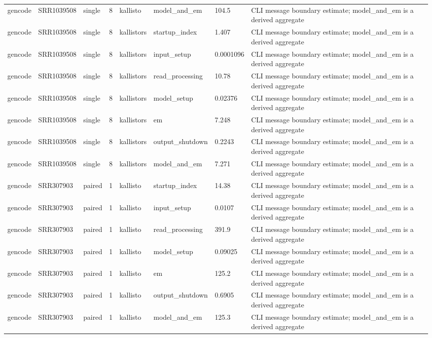 \begin{tabular}{llllllll}
gencode & SRR1039508 & single & 8 & kallisto & model\_and\_em & 104.5 & CLI message boundary estimate; model\_and\_em is a derived aggregate \\
gencode & SRR1039508 & single & 8 & kallistors & startup\_index & 1.407 & CLI message boundary estimate; model\_and\_em is a derived aggregate \\
gencode & SRR1039508 & single & 8 & kallistors & input\_setup & 0.0001096 & CLI message boundary estimate; model\_and\_em is a derived aggregate \\
gencode & SRR1039508 & single & 8 & kallistors & read\_processing & 10.78 & CLI message boundary estimate; model\_and\_em is a derived aggregate \\
gencode & SRR1039508 & single & 8 & kallistors & model\_setup & 0.02376 & CLI message boundary estimate; model\_and\_em is a derived aggregate \\
gencode & SRR1039508 & single & 8 & kallistors & em & 7.248 & CLI message boundary estimate; model\_and\_em is a derived aggregate \\
gencode & SRR1039508 & single & 8 & kallistors & output\_shutdown & 0.2243 & CLI message boundary estimate; model\_and\_em is a derived aggregate \\
gencode & SRR1039508 & single & 8 & kallistors & model\_and\_em & 7.271 & CLI message boundary estimate; model\_and\_em is a derived aggregate \\
gencode & SRR307903 & paired & 1 & kallisto & startup\_index & 14.38 & CLI message boundary estimate; model\_and\_em is a derived aggregate \\
gencode & SRR307903 & paired & 1 & kallisto & input\_setup & 0.0107 & CLI message boundary estimate; model\_and\_em is a derived aggregate \\
gencode & SRR307903 & paired & 1 & kallisto & read\_processing & 391.9 & CLI message boundary estimate; model\_and\_em is a derived aggregate \\
gencode & SRR307903 & paired & 1 & kallisto & model\_setup & 0.09025 & CLI message boundary estimate; model\_and\_em is a derived aggregate \\
gencode & SRR307903 & paired & 1 & kallisto & em & 125.2 & CLI message boundary estimate; model\_and\_em is a derived aggregate \\
gencode & SRR307903 & paired & 1 & kallisto & output\_shutdown & 0.6905 & CLI message boundary estimate; model\_and\_em is a derived aggregate \\
gencode & SRR307903 & paired & 1 & kallisto & model\_and\_em & 125.3 & CLI message boundary estimate; model\_and\_em is a derived aggregate \\

\end{tabular}
